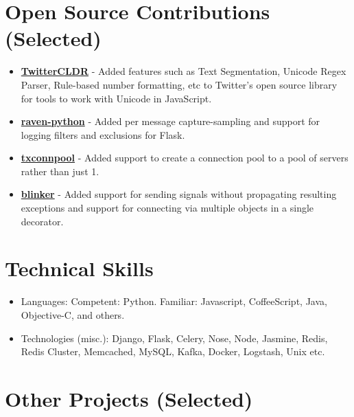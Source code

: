 \section{Open Source Contributions
(Selected)}\label{open-source-contributions-selected}

\begin{itemize}
\tightlist
\item
  \href{https://github.com/twitter/twitter-cldr-js}{\textbf{TwitterCLDR}}
  - Added features such as Text Segmentation, Unicode Regex Parser,
  Rule-based number formatting, etc to Twitter's open source library for
  tools to work with Unicode in JavaScript.
\item
  \href{https://github.com/getsentry/raven-python}{\textbf{raven-python}}
  - Added per message capture-sampling and support for logging filters
  and exclusions for Flask.
\item
  \href{https://github.com/zopim/txconnpool}{\textbf{txconnpool}} -
  Added support to create a connection pool to a pool of servers rather
  than just 1.
\item
  \href{https://github.com/zopim/blinker}{\textbf{blinker}} - Added
  support for sending signals without propagating resulting exceptions
  and support for connecting via multiple objects in a single decorator.
\end{itemize}

\section{Technical Skills}\label{technical-skills}

\begin{itemize}
\tightlist
\item
  Languages: Competent: Python. Familiar: Javascript, CoffeeScript,
  Java, Objective-C, and others.
\item
  Technologies (misc.): Django, Flask, Celery, Nose, Node, Jasmine,
  Redis, Redis Cluster, Memcached, MySQL, Kafka, Docker, Logstash, Unix
  etc.
\end{itemize}

\section{Other Projects (Selected)}\label{other-projects-selected}

